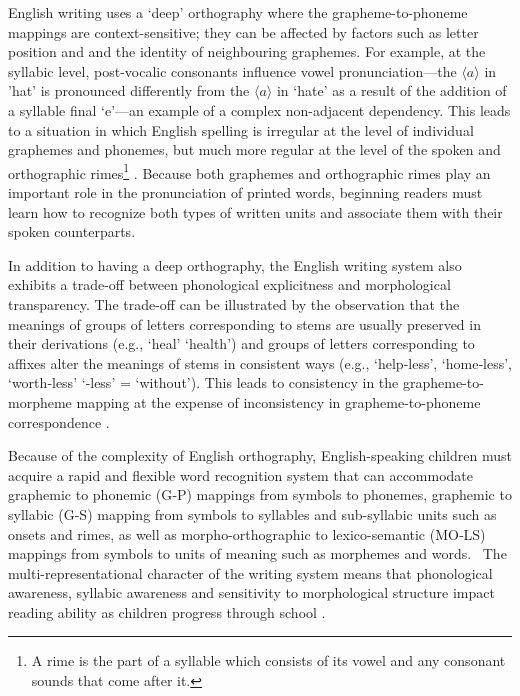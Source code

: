 \documentclass[review]{elsarticle}
\begin{document}
English writing uses a ‘deep’  orthography where the grapheme-to-phoneme mappings are  context-sensitive; they can be affected by factors such as letter position and and the identity of neighbouring graphemes. For example, at the syllabic level, post-vocalic consonants influence vowel pronunciation---the $\langle a\rangle$ in ’hat’ is pronounced differently from the  $\langle a\rangle$ in ‘hate’ as a result of the addition of a syllable final ‘e’---an example of a complex non-adjacent dependency. This leads to a situation in which English spelling is irregular at the level of individual graphemes and phonemes, but much more regular at the level of the spoken and orthographic rimes\footnote{A rime is the part of a syllable which consists of its vowel and any consonant sounds that come after it.} \citep{treimanSpecialRoleRimes1995}. Because both graphemes and orthographic rimes play an important role in the pronunciation of printed words, beginning readers must learn how to recognize both types of written units and associate them with their spoken counterparts.

In addition to having a deep orthography, the English writing system also exhibits a trade-off between phonological explicitness and morphological transparency. The trade-off can be illustrated by the observation that the meanings of groups of letters corresponding to stems are usually preserved in their derivations (e.g., ‘heal’ \textrightarrow ‘health’) and groups of letters corresponding to affixes alter the meanings of stems in consistent ways (e.g., ‘help‑less’, ‘home‑less’, ‘worth‑less’ \textrightarrow ‘‑less’ = ‘without’).  This leads to consistency in the grapheme-to-morpheme mapping at the expense of inconsistency in grapheme-to-phoneme correspondence \citep{zieglerReadingAcquisitionDevelopmental2005,rastlePlaceMorphologyLearning2019}.

Because of the complexity of English orthography, English-speaking children must acquire a rapid and flexible word recognition system that can accommodate graphemic to phonemic (G‑P) mappings from symbols to phonemes, graphemic to syllabic (G-S) mapping from symbols to syllables and sub-syllabic units such as onsets and rimes, as well as  morpho-orthographic to lexico-semantic (MO‑LS) mappings from symbols to units of meaning such as morphemes  and words.  The multi-representational character of the  writing system means that  phonological awareness, syllabic awareness and sensitivity to morphological structure impact reading ability as children progress through school \citep{mahonyReadingAbilitySensitivity2000}.  
\end{document}
